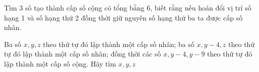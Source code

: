 \begin{bt}%
	Tìm 3 số tạo thành cấp số cộng có tổng bằng 6, biết rằng nếu hoán đổi vị trí số hạng 1 và số hạng thứ 2 đồng thời giữ nguyên số hạng thứ ba ta được cấp số nhân.
\end{bt}
\begin{bt}%
	Ba số $x, y, z$ theo thứ tự đó lập thành một cấp số nhân; ba số $x, y-4, z$ theo thứ tự đó lập thành một cấp số nhân; đồng thời các số $x, y-4, y-9$ theo thứ tự đó lập thành một cấp số cộng. Hãy tìm $x, y, z$
	\loigiai{
		Từ các giả thiết đề bài, ta có:
		\begin{align*}
		\begin{cases}
		y^2=x.z\\
		z+3x=4y\\
		x+y+z=13
		\end{cases}
		\end{align*}
		\begin{center}
			$\Rightarrow \left[ \begin{matrix}
			y=2, x=1, z=4  \\
			y=2, x=4, z=1  \\
			\end{matrix} \right.$\\
		\end{center}
	}
\end{bt}

